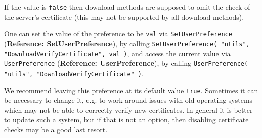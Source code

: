 \documentclass[a4paper,11pt]{report}
\begin{document}
{{{ If the value is \texttt{false} then download methods are supposed to omit the check of the server's
certificate (this may not be supported by all download methods). 

 One can set the value of the preference to be \texttt{val} via \texttt{SetUserPreference} (\textbf{Reference: SetUserPreference}), by calling \texttt{SetUserPreference( "utils", "DownloadVerifyCertificate", val )}, and access the current value via \texttt{UserPreference} (\textbf{Reference: UserPreference}), by calling \texttt{UserPreference( "utils", "DownloadVerifyCertificate" )}. 

 We recommend leaving this preference at its default value \texttt{true}. Sometimes it can be necessary to change it, e.g. to work around issues with
old operating systems which may not be able to correctly verify new
certificates. In general it is better to update such a system, but if that is
not an option, then disabling certificate checks may be a good last resort. }

 }

 }

          
\end{document}

